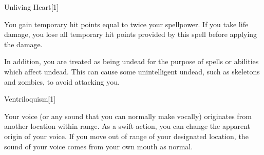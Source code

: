 \begin{spellsection}{Unliving Heart}[1]
    \begin{spellheader}
    \end{spellheader}
    \begin{spellcontent}
        \begin{spelltargetinginfo}
        \end{spelltargetinginfo}
        \begin{spelleffects}
            \spelleffect You gain temporary hit points equal to twice your spellpower. If you take life damage, you lose all temporary hit points provided by this spell before applying the damage.

            In addition, you are treated as being undead for the purpose of spells or abilities which affect undead. This can cause some unintelligent undead, such as skeletons and zombies, to avoid attacking you.
            \spelldur \durlong
        \end{spelleffects}
    \end{spellcontent}
    \begin{spellfooter}
        \miscastexplode
    \end{spellfooter}
\end{spellsection}

\begin{spellsection}{Ventriloquism}[1]
    \begin{spellheader}
    \end{spellheader}
    \begin{spellcontent}
        \begin{spelltargetinginfo}
            \spellrng{\rngmed}
        \end{spelltargetinginfo}
        \begin{spelleffects}
            \spelleffect Your voice (or any sound that you can normally make vocally) originates from another location within range. As a swift action, you can change the apparent origin of your voice. If you move out of range of your designated location, the sound of your voice comes from your own mouth as normal.
            \spelldur \durshort \dismissable
        \end{spelleffects}
    \end{spellcontent}
    \begin{spellfooter}
        \miscastexplode
    \end{spellfooter}
\end{spellsection}

